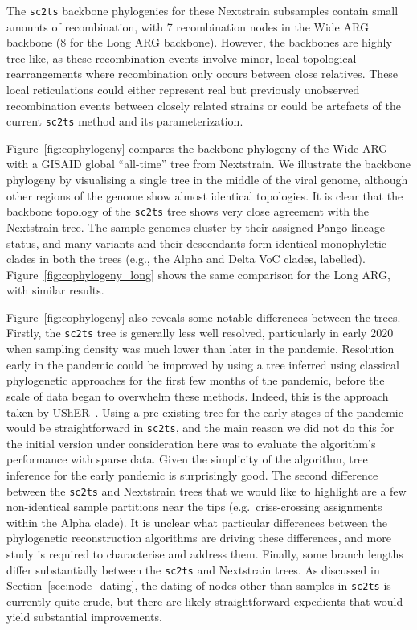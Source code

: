 \documentclass{article}
\begin{document}
The \texttt{sc2ts} backbone phylogenies for these Nextstrain subsamples contain small amounts of recombination,
with 7 recombination nodes in the Wide ARG backbone (8 for the Long ARG
backbone). However, the backbones are highly tree-like, as these
recombination events involve minor, local topological rearrangements
where recombination only occurs between close relatives.
These local reticulations could either represent
real but previously unobserved recombination events between closely related strains
or could be artefacts of the current \texttt{sc2ts} method and its parameterization.

Figure~\ref{fig:cophylogeny} compares the backbone phylogeny of the Wide ARG with
a GISAID global ``all-time'' tree from Nextstrain.
We illustrate the backbone phylogeny by visualising
a single tree in the middle of the viral genome,
although other regions of the
genome show almost identical topologies.
It is clear that the backbone topology of the \texttt{sc2ts} tree shows very close
agreement with the Nextstrain tree. The sample genomes cluster by their
assigned Pango lineage status, and many variants and their descendants form
identical monophyletic clades in both the trees (e.g., the Alpha and Delta VoC
clades, labelled).
Figure~\ref{fig:cophylogeny_long} shows the same comparison for the Long ARG, with similar results.

Figure~\ref{fig:cophylogeny} also reveals some notable differences between the
trees. Firstly, the \texttt{sc2ts} tree is generally less well resolved,
particularly in early 2020 when sampling density was much lower than
later in the pandemic. Resolution early in the pandemic could be improved
by using a tree inferred using classical phylogenetic
approaches for the first few months of the pandemic, before the scale of
data began to overwhelm these methods. Indeed, this is the approach
taken by UShER~\citep{Turakhia2021-ur}. Using a pre-existing tree for
the early stages of the pandemic would be straightforward in \texttt{sc2ts},
and the main reason we did not do this for the initial
version under consideration here was to evaluate the algorithm's
performance with sparse data. Given
the simplicity of the algorithm, tree inference for the early pandemic
is surprisingly good.
The second difference between the \texttt{sc2ts} and Nextstrain trees
that we would like to highlight are a few non-identical sample partitions
near the tips (e.g.\ criss-crossing assignments within the Alpha clade). It is unclear what
particular differences between the phylogenetic reconstruction algorithms are driving these
differences, and more study is required to characterise and address them.
Finally, some branch lengths differ substantially between the \texttt{sc2ts}
and Nextstrain trees.
As discussed in Section~\ref{sec:node_dating}, the dating of nodes
other than samples in \texttt{sc2ts} is currently quite crude,
but there are likely straightforward expedients that would yield
substantial improvements.
\end{document}
